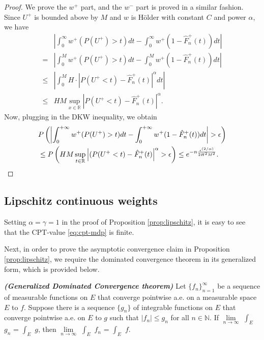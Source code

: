 \begin{proof}
We prove the $w^+$ part, and the $w^-$ part is proved in a similar fashion.
Since $U^+$ is bounded above by $M$ and $w$ is H\"{o}lder with constant $C$ and power $\alpha$, we have
\begin{align*}
&\left|\int_0^{\infty} w^+(P(U^+)>t) dt- \int_0^{\infty} w^+(1- {\hat F^+_n}(t)) dt\right| \\ = &
    \left|\int_0^M w^+(P(U^+)>t) dt- \int_0^M w^+(1- {\hat F^+_n}(t)) dt\right| \\
\leq& \left|\int_0^M H\cdot |P(U^+<t)-{\hat F^+_n}(t)|^\alpha dt\right|\\ \leq& HM\sup_{x\in
\mathbb{R}}\left|P(U^+<t)-{\hat F^+_n}(t)\right|^\alpha.
\end{align*}
Now, plugging in the DKW inequality, we obtain
\begin{align}
&
P\left(\left|\intinfinity w^+(P(U^+)>t) dt- \intinfinity w^+(1- {\hat F^+_n}(t)) dt\right|>\epsilon\right)
\nonumber\\
& \leq P\left(HM\sup_{t\in \mathbb{R}} \left|(P(U^+<t)-{\hat F^+_n}(t)\right|^\alpha>\epsilon\right)
\leq  e^{-n \frac{\epsilon ^{(2/\alpha)}} {2 H^2 M^2}}.\label{eq:dkw3}
\end{align}
\end{proof}

\subsection{Lipschitz continuous weights}
\label{sec:lipschitz-proofs}

 Setting $\alpha=\gamma=1$ in the proof of Proposition \ref{prop:lipschitz}, it is easy to see that the CPT-value \eqref{eq:cpt-mdp} is finite. 

Next, in order to prove the asymptotic convergence claim in Proposition \ref{prop:lipschitz}, we require the dominated convergence theorem in its generalized form, which is provided below.
\begin{theorem}{\textbf{\textit{(Generalized Dominated Convergence theorem)}}}
Let $\{f_n\}_{n=1}^\infty$ be a sequence of measurable functions on $E$ that converge pointwise a.e. on a measurable space $E$ to $f$.  Suppose there is a sequence $\{g_n\}$ of integrable functions on $E$ that converge pointwise a.e. on $E$ to $g$ such that $|f_n| \leq g_n$ for all $n \in \mathbb{N}$.  
If $\lim\limits_{n \rightarrow \infty}$ $\int_E$ $g_n$ = $\int_E$ $g$, then $\lim\limits_{n \rightarrow \infty}$ $\int_E$ $f_n$ = $\int_E$ $f$.
\end{theorem}


